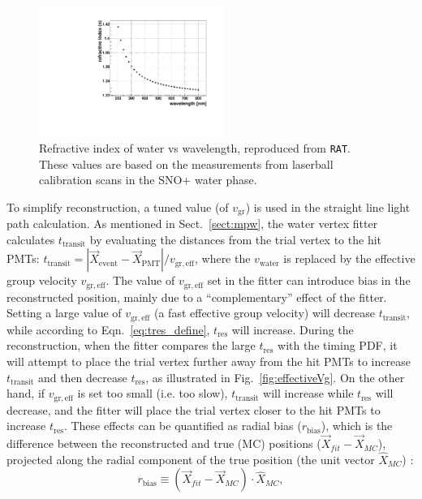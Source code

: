 \begin{figure}[!htb]
	\centering
	\includegraphics[width=6cm]{refractiveIndexVsWavelength.pdf}
	\caption[Refractive index of water vs wavelength.]{Refractive index of water vs wavelength, reproduced from \texttt{RAT}. These values are based on the measurements from laserball calibration scans in the SNO+ water phase\cite{laserball_groupVelocity}.}
	\label{nVsWavelength}
\end{figure}

To simplify reconstruction, a tuned value (of $v_\mathrm{gr}$) is used in the straight line light path calculation. As mentioned in Sect.~\ref{sect:mpw}, the water vertex fitter calculates $t_\mathrm{transit}$ by evaluating the distances from the trial vertex to the hit PMTs: $t_\mathrm{transit}=|\vec{X}_\mathrm{event}-\vec{X}_\mathrm{PMT}|/v_\mathrm{gr,eff}$, where the $v_\mathrm{water}$ is replaced by the effective group velocity $v_\mathrm{gr,eff}$. The value of $v_\mathrm{gr,eff}$ set in the fitter can introduce bias in the reconstructed position, mainly due to a ``complementary'' effect of the fitter. Setting a large value of $v_\mathrm{gr,eff}$ (a fast effective group velocity) will decrease $t_\mathrm{transit}$, while according to Eqn.~\ref{eq:tres_define}, $t_\mathrm{res}$ will increase. During the reconstruction, when the fitter compares the large $t_\mathrm{res}$ with the timing PDF, it will attempt to place the trial vertex further away from the hit PMTs to increase $t_\mathrm{transit}$ and then decrease $t_\mathrm{res}$, as illustrated in Fig.~\ref{fig:effectiveVg}. On the other hand, if $v_\mathrm{gr,eff}$ is set too small (i.e. too slow), $t_\mathrm{transit}$ will increase while $t_\mathrm{res}$ will decrease, and the fitter will place the trial vertex closer to the hit PMTs to increase $t_\mathrm{res}$. These effects can be quantified as radial bias ($r_\mathrm{bias}$), which is the difference between the reconstructed and true (MC) positions ($\vec{X}_{fit}-\vec{X}_{MC}$), projected along the radial component of the true position (the unit vector $\hat{X}_{MC}$) \cite{coulter2013modelling}:
\begin{equation}
r_\mathrm{bias} \equiv (\vec{X}_{fit}-\vec{X}_{MC})\cdot \hat{X}_{MC},
\end{equation}

